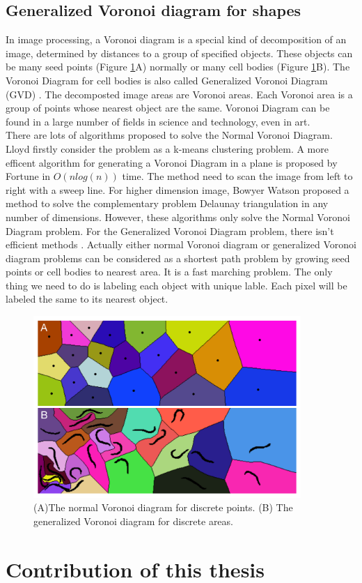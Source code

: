 \subsection{Generalized Voronoi diagram for shapes} \label{subsec:gvd}
In image processing, a Voronoi diagram \cite{aurenhammer1991Voronoi} is a special kind of decomposition of an image, determined by distances to a group of specified objects. These objects can be many seed points (Figure \ref{fig:fm-Voronoi}A) normally or many cell bodies (Figure \ref{fig:fm-Voronoi}B). The Voronoi Diagram for cell bodies is also called Generalized Voronoi Diagram (GVD) \cite{nath2007accurate}. The decomposted image areas are Voronoi areas. Each Voronoi area is a group of points whose nearest object are the same. Voronoi Diagram can be found in a large number of fields in science and technology, even in art.\\
There are lots of algorithms proposed to solve the Normal Voronoi Diagram. Lloyd \cite{lloyd1977triangulations} firstly consider the problem as a k-means clustering problem. A more efficent algorithm for generating a Voronoi Diagram in a plane is proposed by Fortune \cite{fortune1987sweepline} in $O(nlog(n))$ time. The method need to scan the image from left to right with a sweep line. For higher dimension image, Bowyer Watson \cite{rebay1993efficient} proposed a method to solve the complementary problem Delaunay triangulation in any number of dimensions. However, these algorithms only solve the Normal Voronoi Diagram problem. For the Generalized Voronoi Diagram problem, there isn't efficient methods \cite{hoff1999fast, takahashi1989motion, nath2007accurate}. Actually either normal Voronoi diagram or generalized Voronoi diagram problems can be considered as a shortest path problem by growing seed points or cell bodies to nearest area. It is a fast marching problem. The only thing we need to do is labeling each object with unique lable. Each pixel will be labeled the same to its nearest object.

\begin{figure}[htb]
\begin{center}
\includegraphics[width=4in]{images/fm_voronoi}
\caption[Normal Voronoi diagram and generalized Voronoi diagram]{(A)The normal Voronoi diagram for discrete points. (B) The generalized Voronoi diagram for discrete areas.}
\label{fig:fm-Voronoi}
\end{center}
\end{figure}

\section{Contribution of this thesis}

